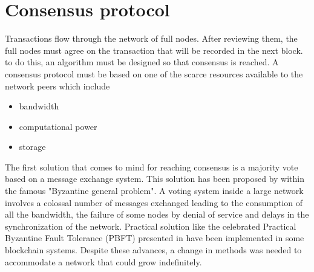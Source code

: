 \chapter{Consensus protocol}\label{chap:consensus}
Transactions flow through the network of full nodes. After reviewing them, the full nodes must agree on the transaction that will be recorded in the next block. to do this, an algorithm must be designed so that consensus is reached.
A consensus protocol must be based on one of the scarce resources available to the network peers which include
\begin{itemize}
	\item bandwidth
	\item computational power
	\item storage 
\end{itemize}
The first solution that comes to mind for reaching consensus is a majority vote based on a message exchange system. This solution has been proposed by \citet{lamport1982the} within the famous "Byzantine general problem". A voting system inside a large network involves a colossal number of messages exchanged leading to the consumption of all the bandwidth, the failure of some nodes by denial of service and delays in the synchronization of the network. Practical solution like the celebrated Practical Byzantine Fault Tolerance (PBFT) presented in \citet{GoHoKrTa16} have been implemented in some blockchain systems. Despite these advances, a change in methods was needed to accommodate a network that could grow indefinitely.\\


